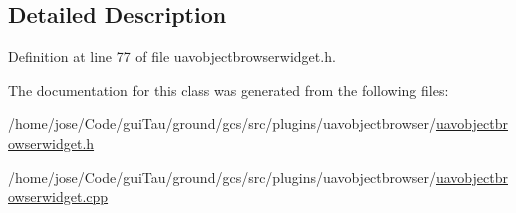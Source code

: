 \subsection{Detailed Description}


Definition at line 77 of file uavobjectbrowserwidget.\-h.



The documentation for this class was generated from the following files\-:\begin{DoxyCompactItemize}
\item 
/home/jose/\-Code/gui\-Tau/ground/gcs/src/plugins/uavobjectbrowser/\hyperlink{uavobjectbrowserwidget_8h}{uavobjectbrowserwidget.\-h}\item 
/home/jose/\-Code/gui\-Tau/ground/gcs/src/plugins/uavobjectbrowser/\hyperlink{uavobjectbrowserwidget_8cpp}{uavobjectbrowserwidget.\-cpp}\end{DoxyCompactItemize}

